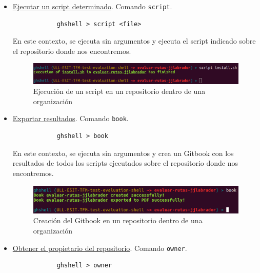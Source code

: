 \begin{itemize}
\newpage
	
	\item \underline{Ejecutar un script determinado}. Comando \verb|script|.
	
		\begin{verbatim}
			ghshell > script <file>
		\end{verbatim}
		
		En este contexto, se ejecuta sin argumentos y ejecuta el script indicado sobre el repositorio donde nos encontremos.
		
		\begin{figure}[H]
		\begin{center}
		\includegraphics[width=1\textwidth]{images/script1-3}
		\caption{Ejecución de un script en un repositorio dentro de una organización}
		\label{fig:script1-3}
		\end{center}
		\end{figure}
		
	\item \underline{Exportar resultados}. Comando \verb|book|.
	
		\begin{verbatim}
			ghshell > book
		\end{verbatim}
		
		En este contexto, se ejecuta sin argumentos y crea un Gitbook con los resultados de todos los scripts ejecutados sobre el repositorio donde nos encontremos.
		
		\begin{figure}[H]
		\begin{center}
		\includegraphics[width=1\textwidth]{images/book1-3}
		\caption{Creación del Gitbook en un repositorio dentro de una organización}
		\label{fig:book1-3}
		\end{center}
		\end{figure}
	
	\item \underline{Obtener el propietario del repositorio}. Comando \verb|owner|.
	
		\begin{verbatim}
			ghshell > owner
		\end{verbatim}
		

\end{itemize}
